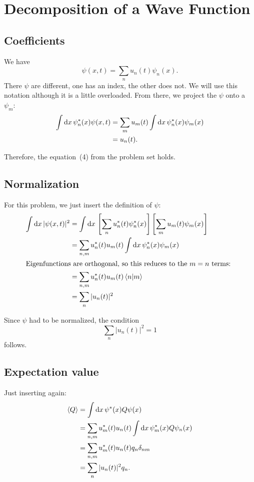 \documentclass[11pt, ngerman, fleqn, DIV=15, headinclude]{scrartcl}
\begin{document}
\section{Decomposition of a Wave Function}

\subsection{Coefficients}

We have
\[
    \psi(x, t) = \sum_n u_n(t) \psi_n(x).
\]
There $\psi$ are different, one has an index, the other does not. We will use
this notation although it is a little overloaded. From there, we project the
$\psi$ onto a $\psi_m$:
\begin{align*}
    \int \dif x \, \psi_n^*(x) \psi(x, t)
    &= \sum_m u_m (t) \int \dif x \, \psi_n^*(x) \psi_m(x) \\
    &= u_n(t).
\end{align*}

Therefore, the equation~(4) from the problem set holds.

\subsection{Normalization}

For this problem, we just insert the definition of $\psi$:
\begin{align*}
    \int \dif x \, |\psi(x, t)|^2
    &= \int \dif x \, \sbr{\sum_n u_n^*(t) \psi_n^*(x)} \sbr{\sum_m u_m(t)
    \psi_m(x)} \\
    &= \sum_{n,m} u_n^*(t) u_m(t) \int \dif x \, \psi_n^*(x) \psi_m(x) \\
    \intertext{%
        Eigenfunctions are orthogonal, so this reduces to the $m = n$ terms:
    }
    &= \sum_{n,m} u_n^*(t) u_m(t) \braket{n|m} \\
    &= \sum_{n} |u_n(t)|^2
\end{align*}

Since $\psi$ had to be normalized, the condition
\[
    \sum_{n} |u_n(t)|^2 = 1
\]
follows.

\subsection{Expectation value}

Just inserting again:
\begin{align*}
    \bracket Q
    &= \int \dif x \, \psi^*(x) Q \psi(x) \\
    &= \sum_{n, m} u_m^*(t) u_n(t) \int \dif x \, \psi_m^*(x) Q \psi_n(x) \\
    &= \sum_{n, m} u_m^*(t) u_n(t) q_n \delta_{nm} \\
    &= \sum_{n} |u_n(t)|^2 q_n .
\end{align*}
\end{document}
